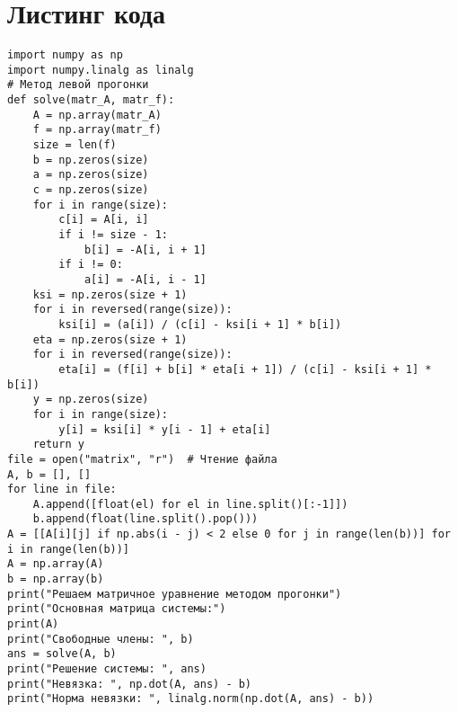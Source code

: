 \documentclass[11.4pt]{article}
\begin{document}
\section{Листинг кода}
\begin{verbatim}
import numpy as np
import numpy.linalg as linalg
# Метод левой прогонки
def solve(matr_A, matr_f):
    A = np.array(matr_A)
    f = np.array(matr_f)
    size = len(f)
    b = np.zeros(size)
    a = np.zeros(size)
    c = np.zeros(size)
    for i in range(size):
        c[i] = A[i, i]
        if i != size - 1:
            b[i] = -A[i, i + 1]
        if i != 0:
            a[i] = -A[i, i - 1]
    ksi = np.zeros(size + 1)
    for i in reversed(range(size)):
        ksi[i] = (a[i]) / (c[i] - ksi[i + 1] * b[i])
    eta = np.zeros(size + 1)
    for i in reversed(range(size)):
        eta[i] = (f[i] + b[i] * eta[i + 1]) / (c[i] - ksi[i + 1] * b[i])
    y = np.zeros(size)
    for i in range(size):
        y[i] = ksi[i] * y[i - 1] + eta[i]
    return y
file = open("matrix", "r")  # Чтение файла
A, b = [], []
for line in file:
    A.append([float(el) for el in line.split()[:-1]])
    b.append(float(line.split().pop()))
A = [[A[i][j] if np.abs(i - j) < 2 else 0 for j in range(len(b))] for i in range(len(b))]
A = np.array(A)
b = np.array(b)
print("Решаем матричное уравнение методом прогонки")
print("Основная матрица системы:")
print(A)
print("Свободные члены: ", b)
ans = solve(A, b)
print("Решение системы: ", ans)
print("Невязка: ", np.dot(A, ans) - b)
print("Норма невязки: ", linalg.norm(np.dot(A, ans) - b))
\end{verbatim}
\end{document}
